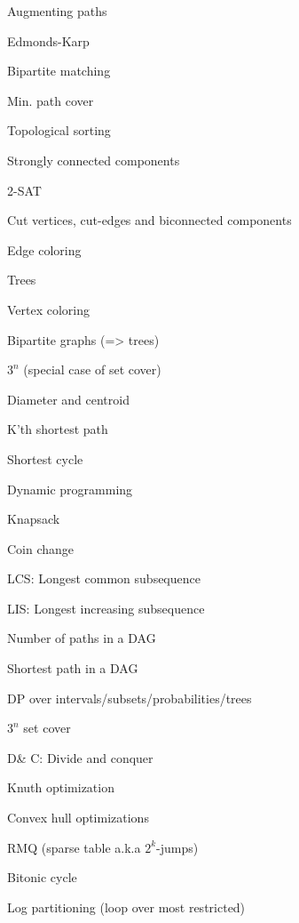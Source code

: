 \begin{myitemize}
\begin{myitemize}
\begin{myitemize}
		\item Augmenting paths
		\item Edmonds-Karp
	\end{myitemize}
	\item Bipartite matching
	\item Min. path cover
	\item Topological sorting
	\item Strongly connected components
	\item 2-SAT
	\item Cut vertices, cut-edges and biconnected components
	\item Edge coloring
	\begin{myitemize}
		\item Trees
	\end{myitemize}
	\item Vertex coloring
	\begin{myitemize}
		\item Bipartite graphs (=> trees)
		\item $3^n$ (special case of set cover)
	\end{myitemize}
	\item Diameter and centroid
	\item K'th shortest path
	\item Shortest cycle
\end{myitemize}
\item Dynamic programming
\begin{myitemize}
	\item Knapsack
	\item Coin change
	\item LCS: Longest common subsequence
	\item LIS: Longest increasing subsequence
	\item Number of paths in a DAG
	\item Shortest path in a DAG
	\item DP over intervals/subsets/probabilities/trees
	\item $3^n$ set cover
	\item D\& C: Divide and conquer
	\item Knuth optimization
	\item Convex hull optimizations
	\item RMQ (sparse table a.k.a $2^k$-jumps)
	\item Bitonic cycle
	\item Log partitioning (loop over most restricted)
\end{myitemize}

\end{myitemize}
